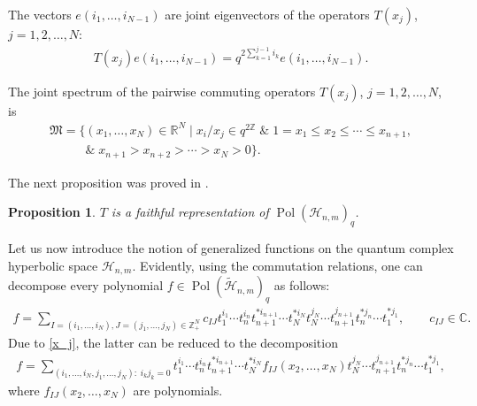 \documentclass[11pt]{article}
\newtheorem{proposition}{Proposition}
\begin{document}
The vectors $e(i_1,\ldots,i_{N-1})$ are joint eigenvectors of the operators $T(x_j)$, $j=1,2,\ldots,N$:
\begin{gather*}%
T(x_j)e(i_1,\ldots,i_{N-1})= q^{2\sum\limits_{k=1}^{j-1}i_k}e(i_1,\ldots,i_{N-1}).
\end{gather*}

The joint spectrum of the pairwise commuting operators $T(x_j)$, $j=1,2,\ldots,N$, is
\begin{gather*}
\mathfrak{M}=\big\{(x_1,\ldots,x_N)\in\mathbb{R}^N \;| \; x_i/x_j\in q^{2\mathbb{Z}}\;\&\;1=x_1\le x_2\le\cdots\le
x_{n+1}, \\
\phantom{\mathfrak{M}=\big\{}{} \&\; x_{n+1}>x_{n+2}>\cdots>x_N>0\big\}.
\end{gather*}

The next proposition was proved in \cite{BS}.

\begin{proposition}
$T$ is a faithful representation of $\operatorname{Pol}(\mathscr{H}_{n,m})_q$.
\end{proposition}



Let us now introduce the notion of generalized functions on the quantum complex hyperbolic space
$\mathscr{H}_{n,m}$. Evidently, using the commutation relations, one can decompose every polynomial $f \in
\operatorname{Pol}(\widetilde{\mathscr{H}}_{n,m})_q$ as follows:
\begin{gather}\label{decomp_pol_Hnm_0}
f= \!\!\!\sum_{I=(i_1,\ldots,i_N), J=(j_1,\ldots,j_N) \in \mathbb Z_+^N}\!\!\! c_{IJ}t_1^{i_1}\cdots
t_n^{i_n}t_{n+1}^{*i_{n+1}}\cdots t_N^{*i_N}t_N^{j_N}\cdots t_{n+1}^{j_{n+1}}t_n^{*j_n}\cdots t_1^{*j_1},
\!\!\!\qquad c_{IJ} \in \mathbb C.\!\!\!
\end{gather}
Due to \eqref{x_j}, the latter can be reduced to the decomposition{\samepage
\begin{gather}\label{decomp_pol_Hnm}
f=\sum_{(i_1,\ldots,i_N,j_1,\ldots,j_N):\;i_kj_k=0} t_1^{i_1}\cdots t_n^{i_n}t_{n+1}^{*i_{n+1}}\cdots
t_N^{*i_N}f_{IJ}(x_2,\ldots,x_N)t_N^{j_N}\cdots t_{n+1}^{j_{n+1}}t_n^{*j_n}\cdots t_1^{*j_1},
\end{gather}
where $f_{IJ}(x_2,\ldots,x_N)$ are polynomials.}
\end{document}
